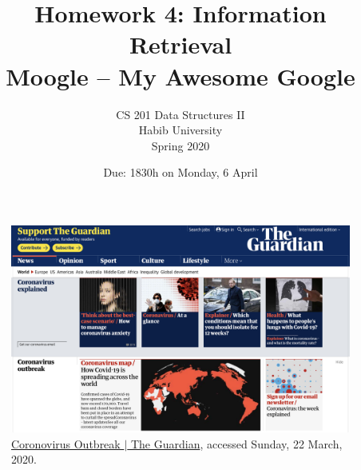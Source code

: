 \documentclass[addpoints]{exam}
\title{Homework 4: Information Retrieval\\Moogle -- My Awesome Google}
\author{CS 201 Data Structures II\\Habib University\\Spring 2020}
\date{Due: 1830h on Monday, 6 April}
\begin{document}
\maketitle

\begin{figure}[h]
  \centering
  \includegraphics[width=.9\textwidth]{guardian}
  \caption{\href{https://www.theguardian.com/world/coronavirus-outbreak}{Coronovirus Outbreak $|$ The Guardian}, accessed Sunday, 22 March, 2020.}
  \label{fig:guardian}
\end{figure}
\end{document}
